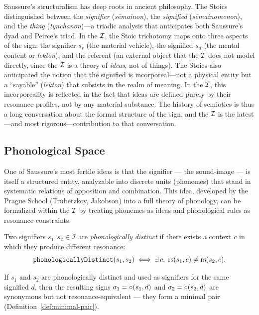 \begin{remark}
Saussure's structuralism has deep roots in ancient philosophy. The Stoics distinguished between the \emph{signifier} (\textit{s\=emainon}), the \emph{signified} (\textit{s\=emainomenon}), and the \emph{thing} (\textit{tynchanon})---a triadic analysis that anticipates both Saussure's dyad and Peirce's triad. In the $\mathcal{I}$, the Stoic trichotomy maps onto three aspects of the sign: the signifier $s_r$ (the material vehicle), the signified $s_d$ (the mental content or \textit{lekton}), and the referent (an external object that the $\mathcal{I}$ does not model directly, since the $\mathcal{I}$ is a theory of \emph{ideas}, not of things). The Stoics also anticipated the notion that the signified is incorporeal---not a physical entity but a ``sayable'' (\textit{lekton}) that subsists in the realm of meaning. In the $\mathcal{I}$, this incorporeality is reflected in the fact that ideas are defined purely by their resonance profiles, not by any material substance. The history of semiotics is thus a long conversation about the formal structure of the sign, and the $\mathcal{I}$ is the latest---and most rigorous---contribution to that conversation.
\end{remark}

\subsection{Phonological Space}

One of Saussure's most fertile ideas is that the signifier --- the
sound-image --- is itself a structured entity, analyzable into
discrete units (phonemes) that stand in systematic relations of
opposition and combination. This idea, developed by the Prague School
(Trubetzkoy, Jakobson) into a full theory of phonology, can be
formalized within the $\mathcal{I}$ by treating phonemes as ideas and
phonological rules as resonance constraints.

\begin{definition}
\label{def:phonological-distinction}
Two signifiers $s_1, s_2 \in \mathcal{I}$ are \emph{phonologically
distinct} if there exists a context $c$ in which they produce
different resonance:
\[
  \texttt{phonologicallyDistinct}(s_1, s_2) \iff
  \exists\, c,\; \mathrm{rs}(s_1, c) \neq \mathrm{rs}(s_2, c).
\]
\end{definition}

\begin{theorem}
\label{thm:phon-distinct}
If $s_1$ and $s_2$ are phonologically distinct and used as signifiers
for the same signified $d$, then the resulting signs
$\sigma_1 = \circ(s_1, d)$ and $\sigma_2 = \circ(s_2, d)$ are
synonymous but not resonance-equivalent --- they form a minimal pair
(Definition~\ref{def:minimal-pair}).
\end{theorem}

